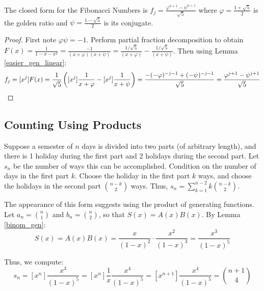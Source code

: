 \documentclass[a4paper]{article}
\begin{document}
\begin{lemma}
The closed form for the Fibonacci Numbers is $\displaystyle f_j=\frac{\varphi^{n+1}-\psi^{n+1}}{\sqrt5}$ where $\varphi=\frac{1+\sqrt5}2$ is the golden ratio and $\psi=\frac{1-\sqrt5}2$ is its conjugate.

\begin{hl}
\begin{proof}
First note $\varphi\psi=-1$. Perform partial fraction decomposition to obtain $F(x)=\frac1{1-x-x^2}=\frac{-1}{(x+\varphi)(x+\psi)}=\frac{1/\sqrt5}{(x+\varphi)}-\frac{1/\sqrt5}{(x+\psi)}$. Then using Lemma \ref{easier_gen_linear}:
\begin{equation*}
f_j
=[x^j]F(x)
=\frac1{\sqrt5}\left([x^j]\frac{1}{x+\varphi}-[x^j]\frac{1}{x+\psi}\right)
=\frac{-(-\varphi)^{-j-1}+(-\psi)^{-j-1}}{\sqrt5}
=\frac{\varphi^{j+1}-\psi^{j+1}}{\sqrt5}\qedhere
\end{equation*}
\end{proof}
\end{hl}
\end{lemma}

\subsection{Counting Using Products}


\begin{example}
Suppose a semester of $n$ days is divided into two parts (of arbitrary length), and there is 1 holiday during the first part and 2 holidays during the second part. Let $s_n$ be the number of ways this can be accomplished. Condition on the number of days in the first part $k$. Choose the holiday in the first part $k$ ways, and choose the holidays in the second part $\binom{n-k}2$ ways. Thus, $s_n=\sum_{k=1}^{n-2}k\binom{n-k}2$.

\medskip

The appearance of this form suggests using the product of generating functions. Let $a_n=\binom n1$ and $b_n=\binom n2$, so that $S(x)=A(x)B(x)$. By Lemma \ref{binom_gen}:
\begin{equation*}
S(x)
=A(x)B(x)
=\frac{x}{(1-x)^2}\cdot \frac{x^2}{(1-x)^3}
=\frac{x^3}{(1-x)^5}
\end{equation*}

Thus, we compute:
\begin{equation*}
s_n
=[x^n]\frac{x^3}{(1-x)^5}
=[x^n]\frac1x\frac{x^4}{(1-x)^5}
=[x^{n+1}]\frac{x^4}{(1-x)^5}
=\binom{n+1}4
\end{equation*}
\end{example}
\end{document}
